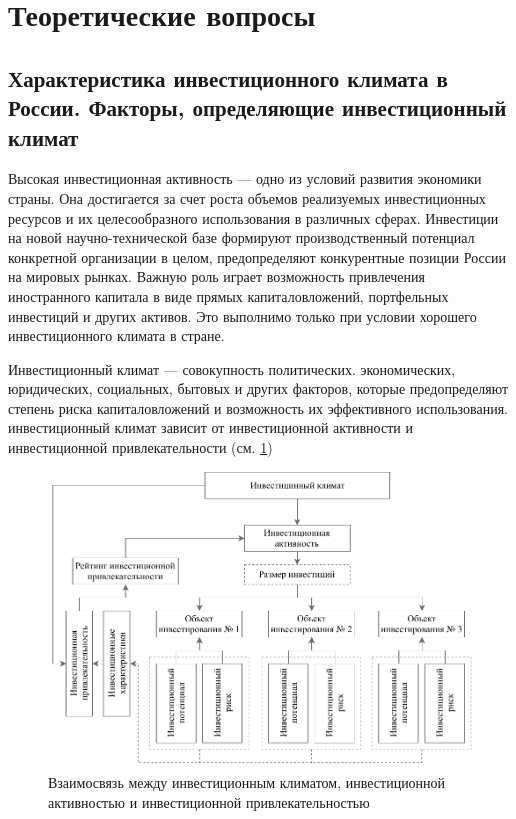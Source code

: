 \section{Теоретические вопросы}
\subsection{Характеристика инвестиционного климата в России. Факторы, определяющие инвестиционный климат}

Высокая инвестиционная активность --- одно из условий развития экономики страны.
Она достигается за счет роста объемов реализуемых инвестиционных ресурсов и их целесообразного использования в различных сферах.
Инвестиции на новой научно-технической базе формируют производственный потенциал конкретной организации в целом, предопределяют конкурентные позиции России на мировых рынках.
Важную роль играет возможность привлечения иностранного капитала в виде прямых капиталовложений, портфельных инвестиций и других активов.
Это выполнимо только при условии хорошего инвестиционного климата в стране.

Инвестиционный климат --- совокупность  политических. экономических, юридических, социальных, бытовых и других факторов, которые предопределяют степень риска капиталовложений и возможность их эффективного использования.
инвестиционный климат зависит от инвестиционной активности и инвестиционной привлекательности (см. \ref{fig:invest})

\begin{figure}[h]
	\centering
	\includegraphics[width=1\linewidth]{invest}
	\caption{Взаимосвязь между инвестиционным климатом, инвестиционной активностью и инвестиционной привлекательностью}
	\label{fig:invest}
\end{figure}

